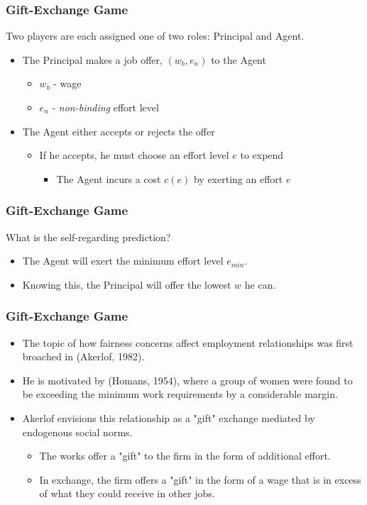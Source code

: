 \documentclass{beamer}
\begin{document}
\begin{frame}
	\frametitle{Gift-Exchange Game}
	Two players are each assigned one of two roles: Principal and Agent. 
	\begin{itemize}
	\item The Principal makes a job offer, $\left(w_b,e_n\right)$ to the Agent
	\begin{itemize}
	\item $w_b$ - wage
	\item $e_n$ - \textit{non-binding} effort level
	\end{itemize}
	\item The Agent either accepts or rejects the offer
	\begin{itemize}
	\item If he accepts, he must choose an effort level $e$ to expend
	\begin{itemize}
	\item The Agent incurs a cost $c(e)$ by exerting an effort $e$
	\end{itemize}
	\end{itemize}
	\end{itemize}

\end{frame}

\begin{frame}
\frametitle{Gift-Exchange Game}
What is the self-regarding prediction? 

\begin{itemize}
	\item The Agent will exert the minimum effort level $e_{min}$.
	\item Knowing this, the Principal will offer the lowest $w$ he can.
	\end{itemize}
\end{frame}

\begin{frame}
	\frametitle{Gift-Exchange Game}
	\begin{itemize}
	\item The topic of how fairness concerns affect employment relationships was first broached in (Akerlof, 1982).
	\item He is motivated by (Homans, 1954), where a group of women were found to be exceeding the minimum work requirements by a considerable margin.
	\item Akerlof envisions this relationship as a "gift" exchange mediated by endogenous social norms.
	\begin{itemize}
	\item The works offer a "gift" to the firm in the form of additional effort.
	\item In exchange, the firm offers a "gift" in the form of a wage that is in excess of what they could receive in other jobs.
	\end{itemize}
	\end{itemize}
\end{frame}
\end{document}
